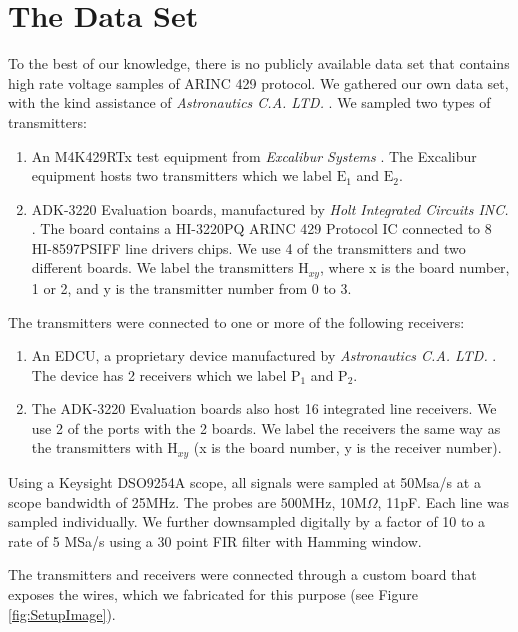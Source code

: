 \documentclass[english]{llncs}
\newcommand{\level}[1]{\section{#1}}
\newcommand{\level}[1]{\chapter{#1}}
\begin{document}
 \vspace*{-2ex} %
\level{The Data Set} \label{TheDataSet}
  To the best of our knowledge, there is no publicly available data set that contains high rate voltage samples of ARINC 429 protocol. We gathered our own data set, with the kind assistance of \textit{Astronautics C.A. LTD.} \cite{astronautics2019home}.   We sampled two types of transmitters:
  \begin{enumerate}
   \vspace*{-1ex} %
     \item An M4K429RTx test equipment from \textit{Excalibur Systems} \cite{excalibur2019m4k429rtx}. The Excalibur equipment hosts two transmitters which we label \(\text{E}_1\) and \(\text{E}_2\).
     \item ADK-3220 Evaluation boards, manufactured by \textit{Holt Integrated Circuits INC.} \cite{holt2019evaluation}. The board contains a HI-3220PQ ARINC 429 Protocol IC connected to 8 HI-8597PSIFF line drivers chips. We use 4 of the transmitters and two different boards. We label the transmitters \(\text{H}_{xy}\), where x is the board number, 1 or 2, and y is the transmitter number from 0 to 3.
  \end{enumerate}
  
  \noindent The transmitters were connected to one or more of the following receivers:
  \begin{enumerate}
   \vspace*{-1ex} %
    \item An EDCU, a proprietary device manufactured by \textit{Astronautics C.A. LTD.} \cite{astronautics2019edcu}. The device has 2 receivers which we label \(\text{P}_1\) and \(\text{P}_2\).
    \item The ADK-3220 Evaluation boards also host 16 integrated line receivers. We use 2 of the ports with the 2 boards. We label the receivers the same way as the transmitters with \(\text{H}_{xy}\) (x is the board number, y is the receiver number).
  \end{enumerate}
  
  Using a Keysight DSO9254A scope, all signals were sampled at 50Msa/s at a scope bandwidth of 25MHz. The probes are 500MHz, 10M\(\Omega\), 11pF. Each line was sampled individually. We further downsampled digitally by a factor of 10 to a rate of 5 MSa/s using a 30 point FIR filter with Hamming window.
  
  The transmitters and receivers were connected through a custom board that exposes the wires, which we fabricated for this purpose (see Figure \ref{fig:SetupImage}).
  
\end{document}
